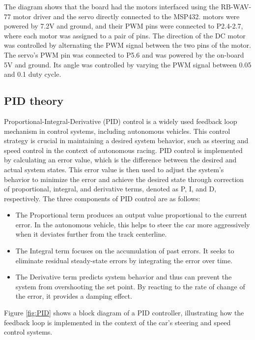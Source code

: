 \documentclass[conference]{IEEEtran}
\begin{document}
The diagram shows that the board had the motors interfaced using the RB-WAV-77 motor driver and the servo directly connected to the MSP432. motors were powered by 7.2V and ground, and their PWM pins were connected to P2.4-2.7, where each motor was assigned to a pair of pins. The direction of the DC motor was controlled by alternating the PWM signal between the two pins of the motor. The servo's PWM pin was connected to P5.6 and was powered by the on-board 5V and ground. Its angle was controlled by varying the PWM signal between 0.05 and 0.1 duty cycle.

\subsection{PID theory}

Proportional-Integral-Derivative (PID) control is a widely used feedback loop mechanism in control systems, including autonomous vehicles. This control strategy is crucial in maintaining a desired system behavior, such as steering and speed control in the context of autonomous racing. PID control is implemented by calculating an error value, which is the difference between the desired and actual system states. This error value is then used to adjust the system's behavior to minimize the error and achieve the desired state through correction of proportional, integral, and derivative terms, denoted as P, I, and D, respectively. The three components of PID control are as follows:

\begin{itemize}
	\item The Proportional term produces an output value proportional to the current error. In the autonomous vehicle, this helps to steer the car more aggressively when it deviates further from the track centerline.
	\item The Integral term focuses on the accumulation of past errors. It seeks to eliminate residual steady-state errors by integrating the error over time.
	\item The Derivative term predicts system behavior and thus can prevent the system from overshooting the set point. By reacting to the rate of change of the error, it provides a damping effect.
\end{itemize}

Figure \ref{fig:PID} shows a block diagram of a PID controller, illustrating how the feedback loop is implemented in the context of the car's steering and speed control systems.
\end{document}
